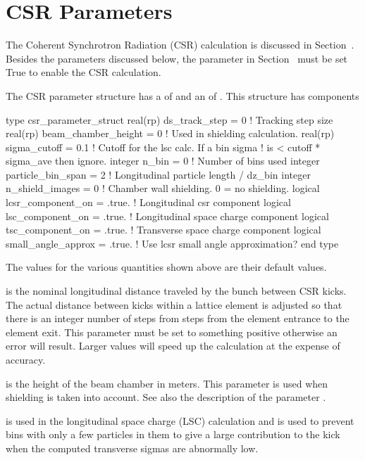 {{{{{{{{%
\section{CSR Parameters}
\label{s:csr.params}

The Coherent Synchrotron Radiation (CSR) calculation is discussed in
Section~. Besides the parameters discussed below, the
 parameter in Section~
must be set True to enable the CSR calculation.

The CSR parameter structure has a 
of  and an  of .
This structure has components
\begin{example}
  type csr_parameter_struct 
    real(rp) ds_track_step = 0          ! Tracking step size
    real(rp) beam_chamber_height = 0    ! Used in shielding calculation.
    real(rp) sigma_cutoff = 0.1         ! Cutoff for the lsc calc. If a bin sigma
                                           !  is < cutoff * sigma_ave then ignore.
    integer n_bin = 0                   ! Number of bins used
    integer particle_bin_span = 2       ! Longitudinal particle length / dz_bin
    integer n_shield_images = 0         ! Chamber wall shielding. 0 = no shielding.
    logical lcsr_component_on = .true.  ! Longitudinal csr component
    logical lsc_component_on = .true.   ! Longitudinal space charge component
    logical tsc_component_on = .true.   ! Transverse space charge component
    logical small_angle_approx = .true. ! Use lcsr small angle approximation?
  end type
\end{example}
The values for the various quantities shown above are their default values. 

 is the nominal longitudinal distance traveled by
the bunch between CSR kicks. The actual distance between kicks within
a lattice element is adjusted so that there is an integer number of
steps from steps from the element entrance to the element exit.  This
parameter must be set to something positive otherwise an error will
result. Larger values will speed up the calculation at the expense of
accuracy.

 is the height of the beam chamber in
meters. This parameter is used when shielding is taken into account.
See also the description of the parameter .

 is used in the longitudinal space charge (LSC)
calculation and is used to prevent bins with only a few particles in
them to give a large contribution to the kick when the computed
transverse sigmas are abnormally low.

}}}}}}}}
